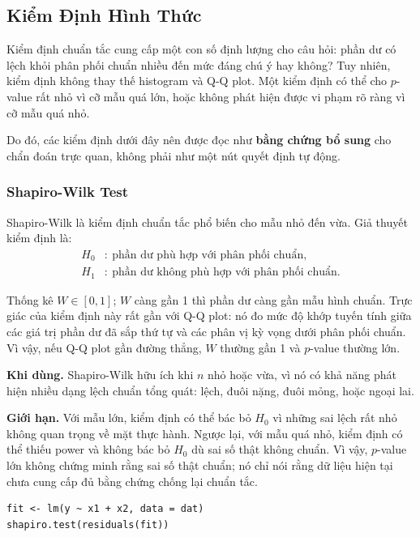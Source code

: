 \subsection{Kiểm Định Hình Thức}

Kiểm định chuẩn tắc cung cấp một con số định lượng cho câu hỏi: phần dư có lệch khỏi phân phối chuẩn nhiều đến mức đáng chú ý hay không? Tuy nhiên, kiểm định không thay thế histogram và Q-Q plot. Một kiểm định có thể cho $p$-value rất nhỏ vì cỡ mẫu quá lớn, hoặc không phát hiện được vi phạm rõ ràng vì cỡ mẫu quá nhỏ.

Do đó, các kiểm định dưới đây nên được đọc như \textbf{bằng chứng bổ sung} cho chẩn đoán trực quan, không phải như một nút quyết định tự động.

\subsubsection{Shapiro-Wilk Test}

Shapiro-Wilk là kiểm định chuẩn tắc phổ biến cho mẫu nhỏ đến vừa. Giả thuyết kiểm định là:
\[
\begin{aligned}
  H_0&{:}\ \text{phần dư phù hợp với phân phối chuẩn},\\
  H_1&{:}\ \text{phần dư không phù hợp với phân phối chuẩn}.
\end{aligned}
\]

Thống kê $W \in [0,1]$; $W$ càng gần 1 thì phần dư càng gần mẫu hình chuẩn. Trực giác của kiểm định này rất gần với Q-Q plot: nó đo mức độ khớp tuyến tính giữa các giá trị phần dư đã sắp thứ tự và các phân vị kỳ vọng dưới phân phối chuẩn. Vì vậy, nếu Q-Q plot gần đường thẳng, $W$ thường gần 1 và $p$-value thường lớn.

\textbf{Khi dùng.} Shapiro-Wilk hữu ích khi $n$ nhỏ hoặc vừa, vì nó có khả năng phát hiện nhiều dạng lệch chuẩn tổng quát: lệch, đuôi nặng, đuôi mỏng, hoặc ngoại lai.

\textbf{Giới hạn.} Với mẫu lớn, kiểm định có thể bác bỏ $H_0$ vì những sai lệch rất nhỏ không quan trọng về mặt thực hành. Ngược lại, với mẫu quá nhỏ, kiểm định có thể thiếu power và không bác bỏ $H_0$ dù sai số thật không chuẩn. Vì vậy, $p$-value lớn không chứng minh rằng sai số thật chuẩn; nó chỉ nói rằng dữ liệu hiện tại chưa cung cấp đủ bằng chứng chống lại chuẩn tắc.

\begin{lstlisting}[style=Rstyle]
fit <- lm(y ~ x1 + x2, data = dat)
shapiro.test(residuals(fit))
\end{lstlisting}

